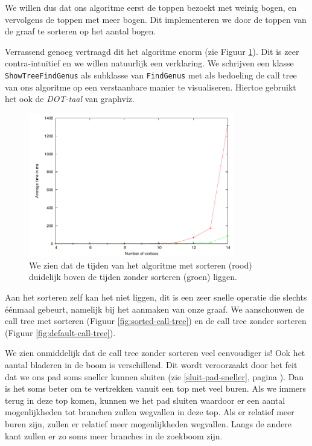 \documentclass{article}
\begin{document}
We willen dus dat ons algoritme eerst de toppen bezoekt met weinig bogen, en
vervolgens de toppen met meer bogen. Dit implementeren we door de toppen van
de graaf te sorteren op het aantal bogen.
\newline

Verrassend genoeg vertraagd dit het algoritme enorm (zie Figuur 
\ref{fig:bounded-vs-sorted}). Dit is zeer
contra-intu\"itief en we willen natuurlijk een verklaring. We schrijven een
klasse \verb#ShowTreeFindGenus# als subklasse van \verb#FindGenus# met als
bedoeling de call tree van ons algoritme op een verstaanbare manier te
visualiseren. Hiertoe gebruikt het ook de \emph{DOT-taal} van graphviz.
\newline

\begin{figure}
\begin{center}
\includegraphics[width=0.8\textwidth]{images/bounded-vs-sorted.pdf}
\caption{We zien dat de tijden van het algoritme met sorteren (rood) duidelijk
boven de tijden zonder sorteren (groen) liggen.}
\label{fig:bounded-vs-sorted}
\end{center}
\end{figure}

Aan het sorteren zelf kan het niet liggen, dit is een zeer snelle operatie
die slechts \'e\'enmaal gebeurt, namelijk bij het aanmaken van onze graaf.
We aanschouwen de call tree met sorteren (Figuur \ref{fig:sorted-call-tree})
en de call tree zonder sorteren (Figuur \ref{fig:default-call-tree}).
\newline

We zien onmiddelijk dat de call tree zonder sorteren veel eenvoudiger is!
Ook het aantal bladeren in de boom is verschillend. Dit wordt veroorzaakt
door het feit dat we ons pad soms sneller kunnen sluiten (zie
\ref{sluit-pad-sneller}, pagina \pageref{sluit-pad-sneller}). Dan is het
soms beter om te vertrekken vanuit een top met veel buren. Als we immers
terug in deze top komen, kunnen we het pad sluiten waardoor er een aantal
mogenlijkheden tot branchen zullen wegvallen in deze top. Als er relatief
meer buren zijn, zullen er relatief meer mogenlijkheden wegvallen. Langs de
andere kant zullen er zo soms meer branches in de zoekboom zijn.
\newline
\end{document}
